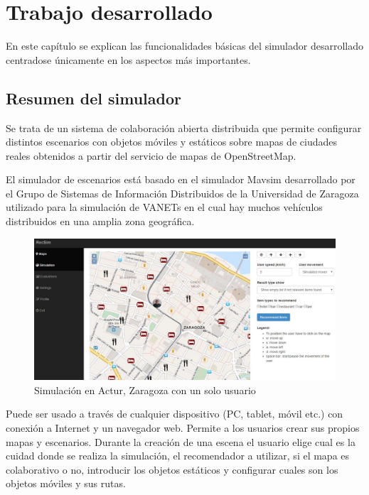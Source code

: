 \chapter{Trabajo desarrollado}


En este capítulo se explican las funcionalidades básicas del simulador desarrollado centradose únicamente en los aspectos más importantes.

\section{Resumen del simulador}


Se trata de un sistema de colaboración abierta distribuida que permite configurar distintos escenarios con objetos móviles y estáticos sobre mapas de ciudades reales obtenidos a partir del servicio de mapas de OpenStreetMap. 

El simulador de escenarios está basado en el simulador Mavsim desarrollado por el Grupo de Sistemas de Información Distribuidos de la Universidad de Zaragoza utilizado para la simulación de VANETs en el cual hay muchos vehículos distribuidos en una amplia zona geográfica.

\begin{figure}[H]
\centering\includegraphics[scale=0.35]{imagenes/resumen-simulador.jpg}
\caption{Simulación en Actur, Zaragoza con un solo usuario}
\label{c2_trama}
\end{figure}

Puede ser usado a través de cualquier dispositivo (PC, tablet, móvil etc.) con conexión a Internet y un navegador web. Permite a los usuarios crear sus propios mapas y escenarios. Durante la creación de una escena el usuario elige cual es la cuidad donde se realiza la simulación, el recomendador a utilizar, si el mapa es colaborativo o no, introducir los objetos estáticos y configurar cuales son los objetos móviles y sus rutas. 

